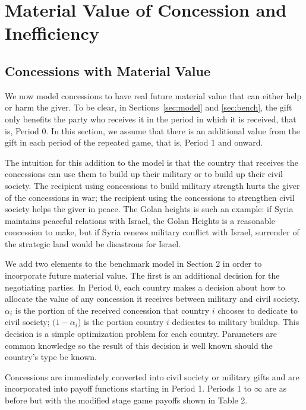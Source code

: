 \documentclass[12pt, letterpaper]{article}
\begin{document}
\section{Material Value of Concession and Inefficiency} 
\label{sec:IC}

\subsection{Concessions with Material Value}
We now model concessions to have real future material value that can either help or harm the giver. To be clear, in Sections~\ref{sec:model} and \ref{sec:bench}, the gift only benefits the party who receives it in the period in which it is received, that is, Period 0. In this section, we assume that there is an additional value from the gift in each period of the repeated game, that is, Period 1 and onward.

The intuition for this addition to the model is that the country that receives the concessions can use them to build up their military or to build up their civil society. The recipient using concessions to build military strength hurts the giver of the concessions in war; the recipient using the concessions to strengthen civil society helps the giver in peace. The Golan heights is such an example: if Syria maintains peaceful relations with Israel, the Golan Heights is a reasonable concession to make, but if Syria renews military conflict with Israel, surrender of the strategic land would be disastrous for Israel. 

We add two elements to the benchmark model in Section 2 in order to incorporate future material value. The first is an additional decision for the negotiating parties. In Period 0, each country makes a decision about how to allocate the value of any concession it receives between military and civil society. $\alpha_i$ is the portion of the received concession that country $i$ chooses to dedicate to civil society; $(1- \alpha_i$) is the portion country $i$ dedicates to military buildup. This decision is a simple optimization problem for each country. Parameters are common knowledge so the result of this decision is well known should the country's type be known.

Concessions are immediately converted into civil society or military gifts and are incorporated into payoff functions starting in Period 1. Periods 1 to $\infty$ are as before but with the modified stage game payoffs shown in Table 2.
\end{document}

